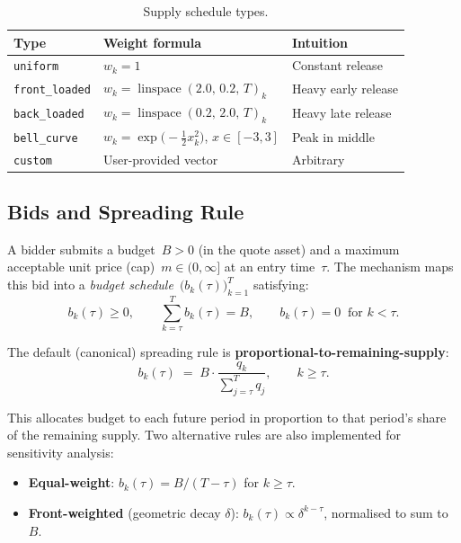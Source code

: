 \documentclass[11pt,a4paper]{article}
\begin{document}
\begin{table}[h]
\centering
\caption{Supply schedule types.}
\label{tab:supply}
\begin{tabular}{@{}lll@{}}
\toprule
\textbf{Type} & \textbf{Weight formula} & \textbf{Intuition} \\
\midrule
\texttt{uniform}       & $w_k = 1$                                              & Constant release \\
\texttt{front\_loaded} & $w_k = \operatorname{linspace}(2.0,\,0.2,\,T)_k$      & Heavy early release \\
\texttt{back\_loaded}  & $w_k = \operatorname{linspace}(0.2,\,2.0,\,T)_k$      & Heavy late release \\
\texttt{bell\_curve}   & $w_k = \exp\!\bigl(-\tfrac{1}{2}x_k^2\bigr)$,\; $x \in [-3,3]$ & Peak in middle \\
\texttt{custom}        & User-provided vector                                    & Arbitrary \\
\bottomrule
\end{tabular}
\end{table}


\subsection{Bids and Spreading Rule}
\label{sec:spreading}

A bidder submits a budget~$B > 0$ (in the quote asset) and a maximum acceptable unit price (cap)~$m \in (0,\infty]$ at an entry time~$\tau$.  The mechanism maps this bid into a \emph{budget schedule}~$\bigl(b_k(\tau)\bigr)_{k=1}^{T}$ satisfying:
\begin{equation}\label{eq:spreading-constraints}
  b_k(\tau) \geq 0, \qquad
  \sum_{k=\tau}^{T} b_k(\tau) = B, \qquad
  b_k(\tau) = 0 \;\;\text{for } k < \tau.
\end{equation}

The default (canonical) spreading rule is \textbf{proportional-to-remaining-supply}:
\begin{equation}\label{eq:proportional-spread}
  b_k(\tau) \;=\; B \cdot \frac{q_k}{\displaystyle\sum_{j=\tau}^{T} q_j}, \qquad k \geq \tau.
\end{equation}

This allocates budget to each future period in proportion to that period's share of the remaining supply.  Two alternative rules are also implemented for sensitivity analysis:
\begin{itemize}[nosep]
  \item \textbf{Equal-weight}: $b_k(\tau) = B/(T - \tau)$ for $k \geq \tau$.
  \item \textbf{Front-weighted} (geometric decay $\delta$): $b_k(\tau) \propto \delta^{k-\tau}$, normalised to sum to~$B$.
\end{itemize}
\end{document}
